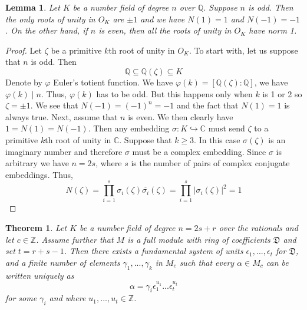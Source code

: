 \documentclass{article}
\newtheorem{theorem}{Theorem}[section]
\newtheorem{lemma}{Lemma}[section]
\newcommand{\mfrak}[1]{\mathfrak{#1}}
\newcommand{\mbb}[1]{\mathbb{#1}}
\numberwithin{equation}{section}
\begin{document}
\begin{lemma}\label{lem: norm of primitive roots}
    Let $K$ be a number field of degree $n$ over $\mbb Q$. Suppose $n$ is odd. Then the only roots of unity in $O_K$ are $\pm 1$ and we have $N(1) = 1$ and $N(-1) = -1$. On the other hand, if $n$ is even, then all the roots of unity in $O_K$ have norm 1.
\end{lemma}
\begin{proof}
    Let $\zeta$ be a primitive $k$th root of unity in $O_K$. To start with, let us suppose that $n$ is odd. Then
    $$\mbb Q \subseteq \mbb Q(\zeta) \subseteq K$$
    Denote by $\varphi$ Euler's totient function. We have $\varphi(k) = [\mbb Q(\zeta) : \mbb Q]$, we have $\varphi(k) \mid n$. Thus, $\varphi(k)$ has to be odd. But this happens only when $k$ is 1 or 2 so $\zeta = \pm 1$. We see that $N(-1) = (-1)^n = -1$ and the fact that $N(1) = 1$ is always true. Next, assume that $n$ is even. We then clearly have $1 = N(1) = N(-1)$. Then any embedding $\sigma : K \hookrightarrow \mbb C$ must send $\zeta$ to a primitive $k$th root of unity in $\mbb C$. Suppose that $k \geq 3$. In this case $\sigma(\zeta)$ is an imaginary number and therefore $\sigma$ must be a complex embedding. Since $\sigma$ is arbitrary we have $n = 2s$, where $s$ is the number of pairs of complex conjugate embeddings. Thus,
    $$N(\zeta)  = \prod_{i=1}^s \sigma_i(\zeta) \overline{\sigma_i}(\zeta) = \prod_{i=1}^s |\sigma_i(\zeta)|^2 = 1$$
\end{proof}


\begin{theorem}\label{thm: Shape of solutions to N(x) = c for x in full module}
    Let $K$ be a number field of degree $n = 2s + r$ over the rationals and let $c \in \mbb Z$. Assume further that $M$ is a full module with ring of coefficients $\mfrak D$ and set $t = r+s-1$. Then there exists a fundamental system of units $\epsilon_1, ..., \epsilon_t$ for $\mfrak D$, and a finite number of elements $\gamma_1, ..., \gamma_k$ in $M_c$ such that every $\alpha \in M_c$ can be written uniquely as
    $$\alpha = \gamma_i \epsilon_1^{u_1} ... \epsilon_t^{u_t}$$
    for some $\gamma_i$ and where $u_1, ..., u_t \in \mbb Z$.
\end{theorem}
\end{document}

